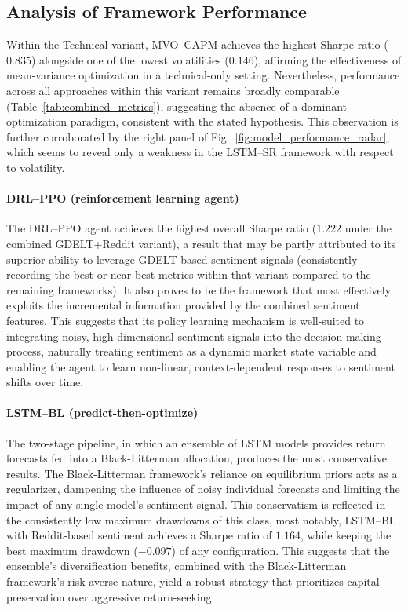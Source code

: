\subsection{Analysis of Framework Performance}
\label{sec:intra_framework}

Within the Technical variant, MVO--CAPM achieves the highest Sharpe ratio ($0.835$) alongside one of the lowest volatilities ($0.146$), affirming the effectiveness of mean-variance optimization in a technical-only setting. Nevertheless, performance across all approaches within this variant remains broadly comparable (Table~\ref{tab:combined_metrics}), suggesting the absence of a dominant optimization paradigm, consistent with the stated hypothesis. This observation is further corroborated by the right panel of Fig.~\ref{fig:model_performance_radar}, which seems to reveal only a weakness in the LSTM--SR framework with respect to volatility.

\paragraph{DRL--PPO (reinforcement learning agent)} The DRL--PPO agent achieves the highest overall Sharpe ratio ($1.222$ under the combined GDELT+Reddit variant), a result that may be partly attributed to its superior ability to leverage GDELT-based sentiment signals (consistently recording the best or near-best metrics within that variant compared to the remaining frameworks). It also proves to be the framework that most effectively exploits the incremental information provided by the combined sentiment features. This suggests that its policy learning mechanism is well-suited to integrating noisy, high-dimensional sentiment signals into the decision-making process, naturally treating sentiment as a dynamic market state variable and enabling the agent to learn non-linear, context-dependent responses to sentiment shifts over time.

\paragraph{LSTM--BL (predict-then-optimize)} The two-stage pipeline, in which an ensemble of LSTM models provides return forecasts fed into a Black-Litterman allocation, produces the most conservative results. The Black-Litterman framework's reliance on equilibrium priors acts as a regularizer, dampening the influence of noisy individual forecasts and limiting the impact of any single model's sentiment signal. This conservatism is reflected in the consistently low maximum drawdowns of this class, most notably, LSTM--BL with Reddit-based sentiment achieves a Sharpe ratio of $1.164$, while keeping the best maximum drawdown ($-0.097$) of any configuration. This suggests that the ensemble's diversification benefits, combined with the Black-Litterman framework's risk-averse nature, yield a robust strategy that prioritizes capital preservation over aggressive return-seeking.

